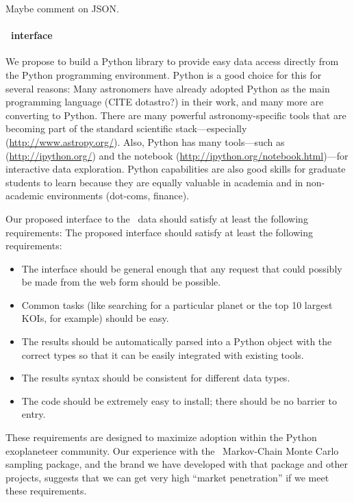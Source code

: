 \documentclass[letterpaper,12pt,preprint]{hack_aastex}
\newcommand{\kplr}{\package{kplr}}
\newcommand{\emcee}{\package{emcee}}
\begin{document}
Maybe comment on JSON.\

\paragraph{\kplr\ interface}
We propose to build a Python library to provide easy data access directly from the Python
programming environment.
Python is a good choice for this for several reasons:
Many astronomers have already adopted Python as the main
programming language (CITE dotastro?) in their work, and many more are converting
to Python.
There are many powerful
astronomy-specific tools that are becoming part of the standard scientific
stack---especially  (\url{http://www.astropy.org/}).
Also, Python has many tools---such as 
 (\url{http://ipython.org/}) and the  notebook
 (\url{http://ipython.org/notebook.html})---for interactive data exploration.
Python capabilities are also good skills for graduate students to learn because they
are equally valuable in academia and in non-academic environments (dot-coms, finance).

Our proposed interface to the \Kepler\ data should satisfy at least the following requirements:
The proposed interface should satisfy at least the following requirements:
\begin{itemize}
\item The interface should be general enough that any request that could
possibly be made from the web form should be possible.
\item Common tasks (like searching for a particular planet or the top 10
largest KOIs, for example) should be easy.
\item The results should be automatically parsed into a Python object with the
correct types so that it can be easily integrated with existing tools.
\item The results syntax should be consistent for different data types.
\item The code should be extremely easy to install; there should be no barrier to entry.
\end{itemize}
These requirements are designed to maximize adoption within the Python
exoplaneteer community.
Our experience with the \emcee\ Markov-Chain Monte Carlo sampling package,
and the brand we have developed with that package and other projects,
suggests that we can get very high ``market penetration'' if we meet these requirements.
\end{document}
